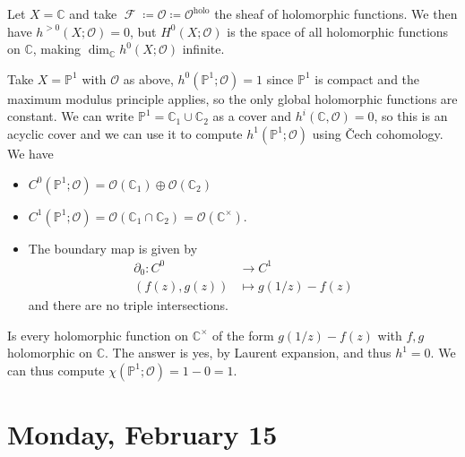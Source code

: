 \begin{example}[?]

Let \(X = {\mathbb{C}}\) and take
\(\operatorname{\mathcal{F}} \coloneqq{\mathcal{O}}\coloneqq{\mathcal{O}}^{\text{holo}}\)
the sheaf of holomorphic functions. We then have
\(h^{> 0}(X; {\mathcal{O}}) = 0\), but \(H^0(X; {\mathcal{O}})\) is the
space of all holomorphic functions on \({\mathbb{C}}\), making
\(\dim_{\mathbb{C}}h^0(X; {\mathcal{O}})\) infinite.

\end{example}

\begin{example}[?]

Take \(X = {\mathbb{P}}^1\) with \({\mathcal{O}}\) as above,
\(h^0({\mathbb{P}}^1; {\mathcal{O}}) = 1\) since \({\mathbb{P}}^1\) is
compact and the maximum modulus principle applies, so the only global
holomorphic functions are constant. We can write
\({\mathbb{P}}^1 = {\mathbb{C}}_1 \cup{\mathbb{C}}_2\) as a cover and
\(h^i({\mathbb{C}}, {\mathcal{O}}) = 0\), so this is an acyclic cover
and we can use it to compute \(h^1({\mathbb{P}}^1; {\mathcal{O}})\)
using Čech cohomology. We have

\begin{itemize}
\item
  \(C^0({\mathbb{P}}^1; {\mathcal{O}}) = {\mathcal{O}}({\mathbb{C}}_1) \oplus {\mathcal{O}}({\mathbb{C}}_2)\)
\item
  \(C^1({\mathbb{P}}^1; {\mathcal{O}}) = {\mathcal{O}}({\mathbb{C}}_1 \cap{\mathbb{C}}_2) = {\mathcal{O}}({\mathbb{C}}^{\times})\).
\item
  The boundary map is given by
  \begin{align*}
  {\partial}_0: C^0 &\to C^1 \\
  ( f(z), g(z) ) &\mapsto g(1/z) - f(z)
  \end{align*}
  and there are no triple intersections.
\end{itemize}

Is every holomorphic function on \({\mathbb{C}}^{\times}\) of the form
\(g(1/z) - f(z)\) with \(f,g\) holomorphic on \({\mathbb{C}}\). The
answer is yes, by Laurent expansion, and thus \(h^1 = 0\). We can thus
compute \(\chi({\mathbb{P}}^1; {\mathcal{O}}) = 1-0 = 1\).

\end{example}

\hypertarget{monday-february-15}{%
\section{Monday, February 15}\label{monday-february-15}}

